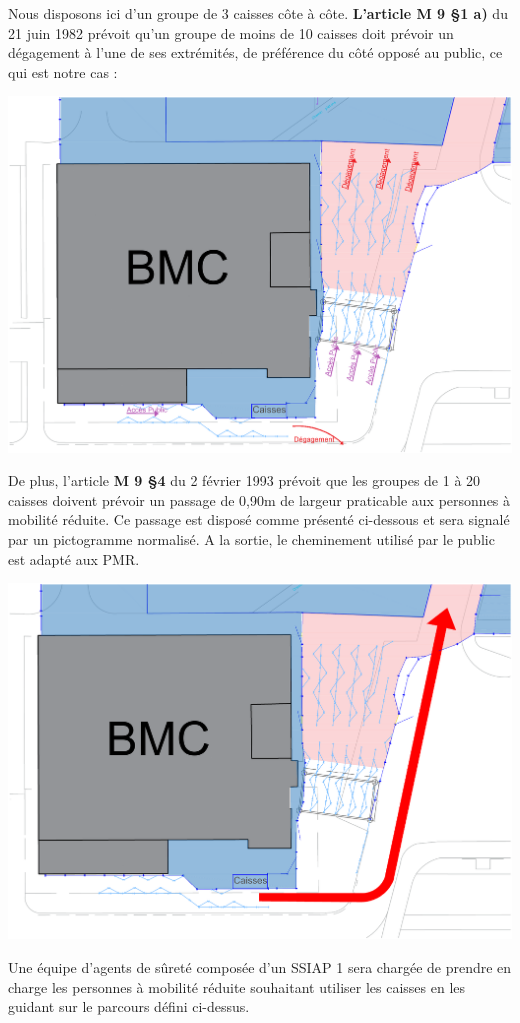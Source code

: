 \documentclass[hidelinks, paper=a4, fontsize=13pt]{report}
\begin{document}
Nous disposons ici d’un groupe de 3 caisses côte à côte. \textbf{L’article M 9 §1 a)} du 21 juin 1982 prévoit qu’un groupe de moins de 10 caisses doit prévoir un dégagement à l’une de ses extrémités, de préférence du côté opposé au public, ce qui est notre cas :
\begin{center}
	\includegraphics[width=.8\textwidth,keepaspectratio]{Exports/Plan_24h_44eme-Entree_Degagements}
\end{center}
De plus, l’article \textbf{M 9 §4 }du 2 février 1993 prévoit que les groupes de 1 à 20 caisses doivent prévoir un passage de 0,90m de largeur praticable aux personnes à mobilité réduite. Ce passage est disposé comme présenté ci-dessous et sera signalé par un pictogramme normalisé. A la sortie, le cheminement utilisé par le public est adapté aux PMR. 

\begin{center}
	\includegraphics[width=.6\textwidth,keepaspectratio]{Exports/Plan_24h_44eme-Entree_PMR}
\end{center}


Une équipe d’agents de sûreté composée d’un SSIAP 1 sera chargée de prendre en charge les personnes à mobilité réduite souhaitant utiliser les caisses en les guidant sur le parcours défini ci-dessus. 
\newpage
\end{document}
